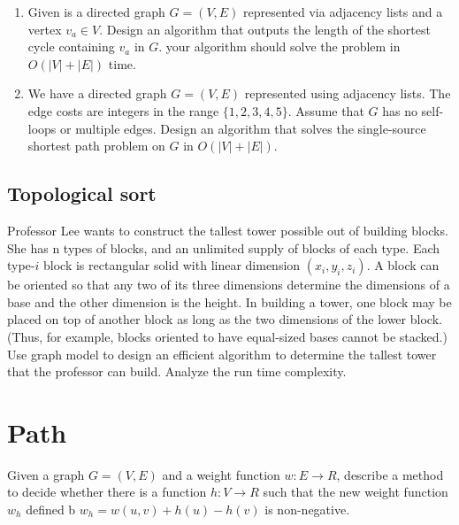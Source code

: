 \begin{Exercise}
\begin{enumerate}
\item Given is a directed graph $G = (V, E)$ represented via adjacency lists and a vertex $v_a \in V$. Design an algorithm that outputs the length of the shortest cycle containing $v_a$ in $G$. your algorithm should solve the problem in $O(|V| + |E|)$ time.
\item We have a directed graph $G = (V, E)$ represented using adjacency lists. The edge costs are integers in the range $\{1, 2, 3, 4, 5\}$. Assume that $G$ has no self-loops or multiple edges. Design an algorithm that solves the single-source shortest path problem on $G$ in $O(|V|+|E|)$.
\end{enumerate}
\end{Exercise}
\begin{Answer}
\end{Answer}

\subsection{Topological sort}
\begin{Exercise}
Professor Lee wants to construct the tallest tower possible out of building blocks. She has n types of blocks, and an unlimited supply of blocks of each type. Each type-$i$ block is rectangular solid with linear dimension $(x_i, y_i, z_i)$. A block can be oriented so that any two of its three dimensions determine the dimensions of a base and the other dimension is the height. In building a tower, one block may be placed on top of another block as long as the two dimensions of the lower block. (Thus, for example, blocks oriented to have equal-sized bases cannot be stacked.) Use graph model to design an efficient algorithm to determine the tallest tower that the professor can build. Analyze the run time complexity. 
\end{Exercise}
\begin{Answer}
\end{Answer}

\section{Path}
\begin{Exercise}
Given a graph $G = (V, E)$ and a weight function $w: E \rightarrow R$, describe a method to decide whether there is a function $h: V \rightarrow R$ such that the new weight function $w_h$ defined b $w_h = w(u, v) + h(u) - h(v)$ is non-negative. 
\end{Exercise}
\begin{Answer}
\end{Answer}

